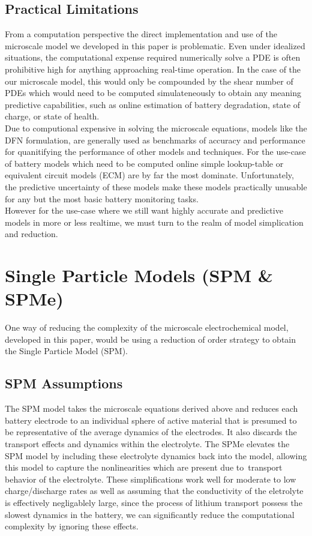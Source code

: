 \documentclass[lettersize,journal]{IEEEtran}
\begin{document}
\subsection{Practical Limitations}
From a computation perspective the direct implementation and use of the microscale model we developed in this paper is problematic. Even under idealized situations, the computational expense required numerically solve a PDE is often prohibitive high for anything approaching real-time operation. In the case of the our microscale model, this would only be compounded by the shear number of PDEs which would need to be computed simulateneously to obtain any meaning predictive capabilities, such as online estimation of battery degradation, state of charge, or state of health. \\

 Due to computional expensive in solving the microscale equations, models like the DFN formulation, are generally used as benchmarks of accuracy and performance for quanitifying the performance of other models and techniques. For the use-case of battery models which need to be computed online simple lookup-table or equivalent circuit models (ECM) are by far the most dominate. Unfortunately, the predictive uncertainty of these models make these models practically unusable for any but the most basic battery monitoring tasks. \\

 However for the use-case where we still want highly accurate and predictive models in more or less realtime, we must turn to the realm of model simplication and reduction.

\section{Single Particle Models (SPM \& SPM{e})}
One way of reducing the complexity of the microscale electrochemical model, developed in this paper, would be using a reduction of order strategy to obtain the Single Particle Model (SPM).

\subsection{SPM Assumptions}

 The SPM model takes the microscale equations derived above and reduces each battery electrode to an individual sphere of active material that is presumed to be representative of the average dynamics of the electrodes. It also discards the transport effects and dynamics within the electrolyte. The SPMe elevates the SPM model by including these electrolyte dynamics back into the model, allowing this model to capture the nonlinearities which are present due to\ transport behavior of the electrolyte. These simplifications work well for moderate to low charge/discharge rates as well as assuming that the conductivity of the eletrolyte is effectively negligablely large, since the process of lithium transport possess the slowest dynamics in the battery, we can significantly reduce the computational complexity by ignoring these effects.
\end{document}
